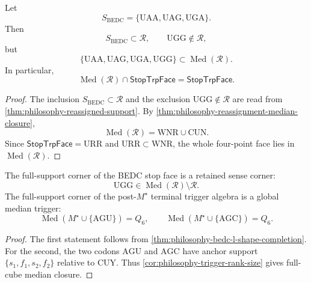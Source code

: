 \begin{theorem}
\label{thm:philosophy-bedc-l-shape-completion}
Let
$$
  S_{\mathrm{BEDC}}
  =
  \{\mathrm{UAA},\mathrm{UAG},\mathrm{UGA}\}.
$$
Then
$$
  S_{\mathrm{BEDC}}\subset \mathcal{R},
  \qquad
  \mathrm{UGG}\notin\mathcal{R},
$$
but
$$
  \{\mathrm{UAA},\mathrm{UAG},\mathrm{UGA},\mathrm{UGG}\}
  \subset
  \operatorname{Med}(\mathcal{R}).
$$
In particular,
$$
  \operatorname{Med}(\mathcal{R})\cap \mathsf{StopTrpFace}
  =
  \mathsf{StopTrpFace}.
$$
\end{theorem}
\begin{proof}
The inclusion $S_{\mathrm{BEDC}}\subset \mathcal{R}$ and the exclusion
$\mathrm{UGG}\notin\mathcal{R}$ are read from
\autoref{thm:philosophy-reassigned-support}. By
\autoref{thm:philosophy-reassignment-median-closure},
$$
  \operatorname{Med}(\mathcal{R})=\mathrm{WNR}\cup\mathrm{CUN}.
$$
Since $\mathsf{StopTrpFace}=\mathrm{URR}$ and
$\mathrm{URR}\subset\mathrm{WNR}$, the whole four-point face lies in
$\operatorname{Med}(\mathcal{R})$.
\end{proof}

\begin{corollary}
\label{cor:philosophy-full-support-corner-roles}
The full-support corner of the BEDC stop face is a retained sense corner:
$$
  \mathrm{UGG}\in \operatorname{Med}(\mathcal{R})\setminus\mathcal{R}.
$$
The full-support corner of the post-$M^{\star}$ terminal trigger algebra is
a global median trigger:
$$
  \operatorname{Med}(M^{\star}\cup\{\mathrm{AGU}\})=Q_{6},
  \qquad
  \operatorname{Med}(M^{\star}\cup\{\mathrm{AGC}\})=Q_{6}.
$$
\end{corollary}
\begin{proof}
The first statement follows from
\autoref{thm:philosophy-bedc-l-shape-completion}. For the second, the two
codons $\mathrm{AGU}$ and $\mathrm{AGC}$ have anchor support
$\{s_{1},f_{1},s_{2},f_{2}\}$ relative to $\mathrm{CUY}$. Thus
\autoref{cor:philosophy-trigger-rank-size} gives full-cube median closure.
\end{proof}

